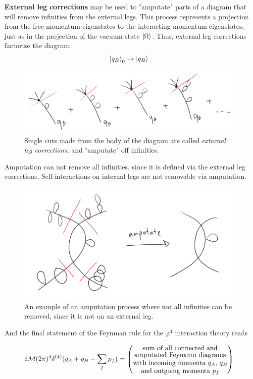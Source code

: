 \noindent \textbf{External leg corrections} may be used to "amputate" parts of a diagram that will remove infinities from the external legs. This process represents a projection from the free momentum eigenstates to the interacting momentum eigenstates, just as in the projection of the vacuum state $\ket{\Omega}$. Thus, external leg corrections factorize the diagram. 
\begin{equation}
\ket{q_B}_0 \to \ket{q_B}
\end{equation}

\begin{figure}[H]
	\centering
	\includegraphics[scale=0.4]{extlegcorr.png}
	\caption{Single cuts made from the body of the diagram are called \textit{external leg corrections}, and "amputate" off infinities.}
\end{figure}

\noindent Amputation can not remove all infinities, since it is defined via the external leg corrections. Self-interactions on internal legs are not removable via amputation.

\begin{figure}[H]
	\centering
	\includegraphics[scale=0.4]{amputation.png}
	\caption{An example of an amputation process where not all infinities can be removed, since it is not on an external leg.}
\end{figure}

\noindent And the final statement of the Feynman rule for the $\varphi^4$ interaction theory reads

\begin{equation}
i \mathcal{M} (2\pi)^4 \delta^{(4)} (q_A + q_B - \sum_f p_f) = \left( \stackanchor{\stackanchor{sum of all connected and}{amputated Feynamn diagrams}}{\stackanchor{with incoming momenta $q_A$, $q_B$}{and outgoing momenta $p_f$}} \right)
\end{equation}
